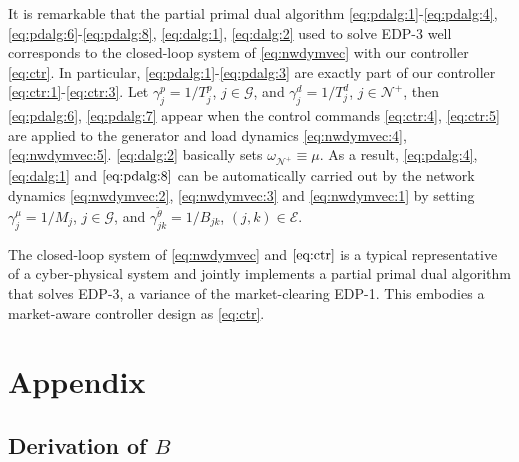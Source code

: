 \documentclass[journal,12pt,onecolumn,draftclsnofoot]{IEEEtran}
\begin{document}
It is remarkable that the partial primal dual algorithm \eqref{eq:pdalg:1}-\eqref{eq:pdalg:4}, \eqref{eq:pdalg:6}-\eqref{eq:pdalg:8}, \eqref{eq:dalg:1}, \eqref{eq:dalg:2} used to solve EDP-3 well corresponds to the closed-loop system of \eqref{eq:nwdymvec} with our controller \eqref{eq:ctr}. In particular, \eqref{eq:pdalg:1}-\eqref{eq:pdalg:3} are exactly part of our controller \eqref{eq:ctr:1}-\eqref{eq:ctr:3}. Let $\gamma_j^p=1/T^{p}_j$, $j\in\mathcal{G}$, and $\gamma_j^d=1/T_j^d$, $j\in\mathcal{N}^+$, then \eqref{eq:pdalg:6}, \eqref{eq:pdalg:7} appear when the control commands \eqref{eq:ctr:4}, \eqref{eq:ctr:5} are applied to the generator and load dynamics \eqref{eq:nwdymvec:4}, \eqref{eq:nwdymvec:5}. \eqref{eq:dalg:2} basically sets $\omega_{\mathcal{N}^+} \equiv \mu$. As a result, \eqref{eq:pdalg:4}, \eqref{eq:dalg:1} and $\eqref{eq:pdalg:8}$ can be automatically carried out by the network dynamics \eqref{eq:nwdymvec:2}, \eqref{eq:nwdymvec:3} and \eqref{eq:nwdymvec:1} by setting $\gamma^\mu_j=1/M_j$, $j\in\mathcal{G}$, and $\gamma^{\tilde{\theta}}_{jk}=1/B_{jk}$, $(j,k)\in\mathcal{E}$.

The closed-loop system of \eqref{eq:nwdymvec} and $\eqref{eq:ctr}$ is a typical representative of a cyber-physical system and jointly implements a partial primal dual algorithm that solves EDP-3, a variance of the market-clearing EDP-1. This embodies a market-aware controller design as \eqref{eq:ctr}.  



















\newpage
\appendix
\section{Appendix}

\subsection{Derivation of $B$}
\end{document}
